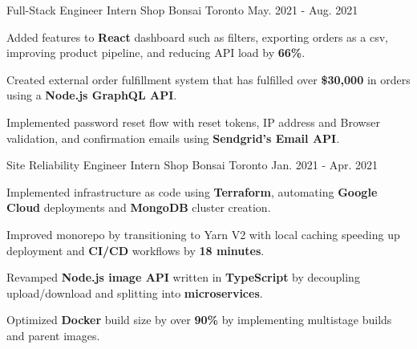 

\begin{cventries}

  \cventry
    {Full-Stack Engineer Intern} %
    {Shop Bonsai} %
    {Toronto} %
    {May. 2021 - Aug. 2021} %
    {
      \begin{cvitems} %
        \item {Added features to \textbf{React} dashboard such as filters, exporting orders as a csv, improving product pipeline, and reducing API load by \textbf{66\%}.}
        \item {Created external order fulfillment system that has fulfilled over \textbf{\$30,000} in orders using a \textbf{Node.js GraphQL API}.}
        \item {Implemented password reset flow with reset tokens, IP address and Browser validation, and confirmation emails using \textbf{Sendgrid's Email API}.}
      \end{cvitems}
    }
    
  \cventry
    {Site Reliability Engineer Intern} %
    {Shop Bonsai} %
    {Toronto} %
    {Jan. 2021 - Apr. 2021} %
    {
      \begin{cvitems} %
        \item {Implemented infrastructure as code using \textbf{Terraform}, automating \textbf{Google Cloud} deployments and \textbf{MongoDB} cluster creation.}
        \item {Improved monorepo by transitioning to Yarn V2 with local caching speeding up deployment and \textbf{CI/CD} workflows by \textbf{18 minutes}.}
        \item {Revamped \textbf{Node.js image API} written in \textbf{TypeScript} by decoupling upload/download and splitting into \textbf{microservices}.}
        \item {Optimized \textbf{Docker} build size by over \textbf{90\%} by implementing multistage builds and parent images.}
      \end{cvitems}
    }
    
\end{cventries}
